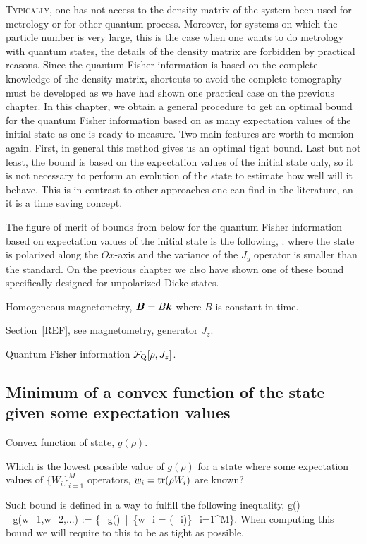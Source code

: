 \lettrine[lines=2, findent=3pt,nindent=0pt]{T}{ypically}, one has not access to the density matrix of the system been used for metrology or for other quantum process.
Moreover, for systems on which the particle number is very large, this is the case when one wants to do metrology with quantum states, the details of the density matrix are forbidden by practical reasons.
Since the quantum Fisher information is based on the complete knowledge of the density matrix, shortcuts to avoid the complete tomography must be developed as we have had shown one practical case on the previous chapter.
In this chapter, we obtain a general procedure to get an optimal bound for the quantum Fisher information based on as many expectation values of the initial state as one is ready to measure.
Two main features are worth to mention again.
First, in general this method gives us an optimal tight bound.
Last but not least, the bound is based on the expectation values of the initial state only, so it is not necessary to perform an evolution of the state to estimate how well will it behave.
This is in contrast to other approaches one can find in the literature, an it is a time saving concept.

The figure of merit of bounds from below for the quantum Fisher information based on expectation values of the initial state is the following,
\be
  \qfi [\rho,J_z] \geq {}.
\ee
where the state is polarized along the $Ox$-axis and the variance of the $J_y$ operator is smaller than the standard.
On the previous chapter we also have shown one of these bound specifically designed for unpolarized Dicke states.

Homogeneous magnetometry, $\boldsymbol{B} = B\boldsymbol{k}$ where $B$ is constant in time.

Section~[REF], see magnetometry, generator $J_z$.

Quantum Fisher information $\mathcal{F}_{\text{Q}} [\rho, J_z]$.

\subsection{Minimum of a convex function of the state given some expectation values}

Convex function of state, $g(\rho)$.

Which is the lowest possible value of $g(\rho)$ for a state where some expectation values of $\{W_{i}\}_{i=1}^M$ operators, $w_i = \operatorname{tr}(\rho {W}_i)$ are known?

Such bound is defined in a way to fulfill the following inequality,
\be
  g(\rho) \geq {}_{g}(w_1,w_2,...) := \big\{\min_{\rho}g(\rho) \,|\,  \{w_i = \tr(_i)\}_{i=1}^M\big\}.
\ee
When computing this bound we will require to this to be as tight as possible.

